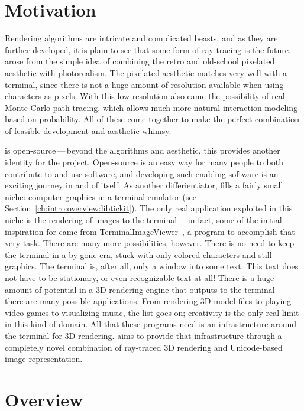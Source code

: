\section{Motivation}
\label{ch:intro:motivation}

Rendering algorithms are intricate and complicated beasts, and as they are further developed, it is plain to see that some form of ray-tracing is the future.
\name{} arose from the simple idea of combining the retro and old-school pixelated aesthetic with photorealism.
The pixelated aesthetic matches very well with a terminal, since there is not a huge amount of resolution available when using characters as pixels.
With this low resolution also came the possibility of real Monte-Carlo path-tracing, which allows much more natural interaction modeling based on probability.
All of these come together to make \name{} the perfect combination of feasible development and aesthetic whimsy.

\name{} is open-source\,---\,beyond the algorithms and aesthetic, this provides another identity for the project.
Open-source is an easy way for many people to both contribute to and use software, and developing such enabling software is an exciting journey in and of itself.
As another differientiator, \name{} fills a fairly small niche: computer graphics in a terminal emulator (see Section~\ref{ch:intro:overview:libtickit}).
The only real application exploited in this niche is the rendering of images to the terminal\,---\,in fact, some of the initial inspiration for \name{} came from TerminalImageViewer~\cite{tivGithub}, a program to accomplish that very task.
There are many more possibilities, however.
There is no need to keep the terminal in a by-gone era, stuck with only colored characters and still graphics.
The terminal is, after all, only a window into some text.
This text does not have to be stationary, or even recognizable text at all!
There is a huge amount of potential in a 3D rendering engine that outputs to the terminal\,---\,there are many possible applications.
From rendering 3D model files to playing video games to visualizing music, the list goes on; creativity is the only real limit in this kind of domain.
All that these programs need is an infrastructure around the terminal for 3D rendering.
\name{} aims to provide that infrastructure through a completely novel combination of ray-traced 3D rendering and Unicode-based image representation.

\section{Overview}
\label{ch:intro:overview}

